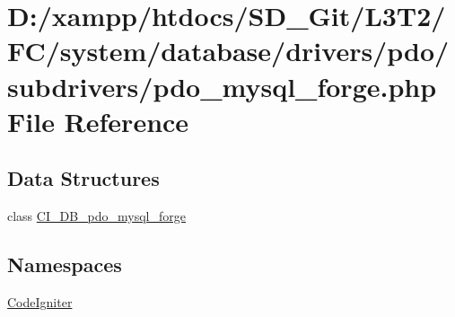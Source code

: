 \hypertarget{pdo__mysql__forge_8php}{}\section{D\+:/xampp/htdocs/\+S\+D\+\_\+\+Git/\+L3\+T2/\+F\+C/system/database/drivers/pdo/subdrivers/pdo\+\_\+mysql\+\_\+forge.php File Reference}
\label{pdo__mysql__forge_8php}
\subsection*{Data Structures}
\begin{DoxyCompactItemize}
\item 
class \hyperlink{class_c_i___d_b__pdo__mysql__forge}{C\+I\+\_\+\+D\+B\+\_\+pdo\+\_\+mysql\+\_\+forge}
\end{DoxyCompactItemize}
\subsection*{Namespaces}
\begin{DoxyCompactItemize}
\item 
 \hyperlink{namespace_code_igniter}{Code\+Igniter}
\end{DoxyCompactItemize}
